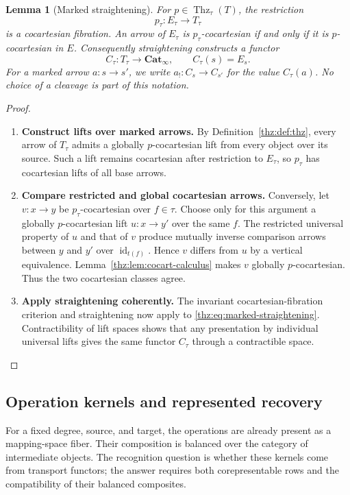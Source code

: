 \documentclass[oneside]{article}
\theoremstyle{plain}
\newtheorem{lemma}[theorem]{Lemma}
\theoremstyle{definition}
\theoremstyle{remark}
\newcommand{\Cat}{\mathbf{Cat}_{\infty}}
\newcommand{\Thz}{\operatorname{Thz}}
\newcommand{\id}{\operatorname{id}}
\begin{document}
\begin{lemma}[Marked straightening]\label{thz:lem:marked-straightening}
For $p\in\Thz_\tau(T)$, the restriction
\begin{equation}\label{thz:eq:marked-straightening}
 p_\tau:E_\tau\longrightarrow T_\tau
\end{equation}
is a cocartesian fibration.  An arrow of $E_\tau$ is $p_\tau$-cocartesian
if and only if it is $p$-cocartesian in $E$.  Consequently straightening
constructs a functor
\[
 C_\tau:T_\tau\longrightarrow\Cat,
 \qquad C_\tau(s)=E_s.
\]
For a marked arrow $a:s\to s'$, we write
$a_!:C_s\to C_{s'}$ for the value $C_\tau(a)$.  No choice of a cleavage
is part of this notation.
\end{lemma}
\begin{proof}
\leavevmode
\begin{enumerate}
\item \textbf{Construct lifts over marked arrows.} By Definition~\ref{thz:def:thz}, every arrow of $T_\tau$ admits a globally
$p$-cocartesian lift from every object over its source.  Such a lift remains
cocartesian after restriction to $E_\tau$, so $p_\tau$ has cocartesian
lifts of all base arrows.
\item \textbf{Compare restricted and global cocartesian arrows.} Conversely, let $v:x\to y$ be $p_\tau$-cocartesian over $f\in\tau$.
Choose only for this argument a globally $p$-cocartesian lift
$u:x\to y'$ over the same $f$.  The restricted universal property of
$u$ and that of $v$ produce mutually inverse comparison arrows between
$y$ and $y'$ over $\id_{t(f)}$.  Hence $v$ differs from $u$ by a
vertical equivalence.  Lemma~\ref{thz:lem:cocart-calculus} makes $v$
globally $p$-cocartesian.  Thus the two cocartesian classes agree.
\item \textbf{Apply straightening coherently.} The invariant cocartesian-fibration criterion and straightening now apply
to \eqref{thz:eq:marked-straightening}.  Contractibility of lift spaces
shows that any presentation by individual universal lifts gives the same
functor $C_\tau$ through a contractible space.\cite{HHLN2023}\qedhere
\end{enumerate}
\end{proof}

\subsection{Operation kernels and represented recovery}

For a fixed degree, source, and target, the operations are already present
as a mapping-space fiber. Their composition is balanced over the category
of intermediate objects. The recognition question is whether these
kernels come from transport functors; the answer requires both
corepresentable rows and the compatibility of their balanced composites.
\end{document}
